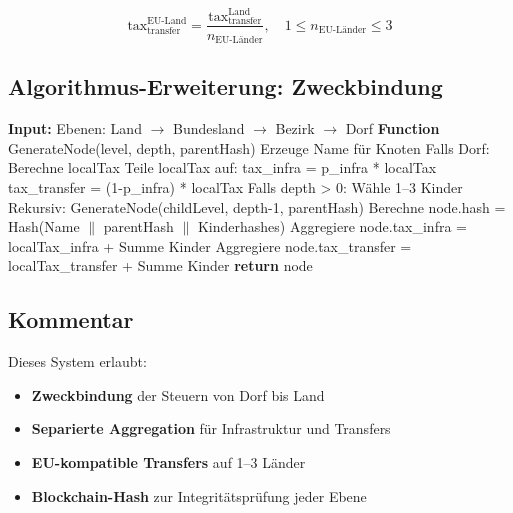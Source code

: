 \begin{equation}
\text{tax}_\text{transfer}^{\text{EU-Land}} = \frac{\text{tax}_\text{transfer}^{\text{Land}}}{n_\text{EU-Länder}}, \quad 1 \le n_\text{EU-Länder} \le 3
\end{equation}

\subsection{Algorithmus-Erweiterung: Zweckbindung}

\begin{algorithm}
\caption{Baum erzeugen mit Hashes, Steuern und Zweckbindung}
\begin{algorithmic}[1]
\STATE \textbf{Input:} Ebenen: Land $\rightarrow$ Bundesland $\rightarrow$ Bezirk $\rightarrow$ Dorf
\STATE \textbf{Function} GenerateNode(level, depth, parentHash)
\STATE \quad Erzeuge Name für Knoten
\STATE \quad Falls Dorf:
\STATE \quad \quad Berechne localTax
\STATE \quad \quad Teile localTax auf: 
\STATE \quad \quad \quad tax\_infra = p\_infra * localTax
\STATE \quad \quad \quad tax\_transfer = (1-p\_infra) * localTax
\STATE \quad Falls depth > 0:
\STATE \quad \quad Wähle 1--3 Kinder
\STATE \quad \quad Rekursiv: GenerateNode(childLevel, depth-1, parentHash)
\STATE \quad Berechne node.hash = Hash(Name $\|$ parentHash $\|$ Kinderhashes)
\STATE \quad Aggregiere node.tax\_infra = localTax\_infra + Summe Kinder
\STATE \quad Aggregiere node.tax\_transfer = localTax\_transfer + Summe Kinder
\STATE \quad \textbf{return} node
\end{algorithmic}
\end{algorithm}

\subsection{Kommentar}
Dieses System erlaubt:
\begin{itemize}
    \item \textbf{Zweckbindung} der Steuern von Dorf bis Land
    \item \textbf{Separierte Aggregation} für Infrastruktur und Transfers
    \item \textbf{EU-kompatible Transfers} auf 1--3 Länder
    \item \textbf{Blockchain-Hash} zur Integritätsprüfung jeder Ebene
\end{itemize}

